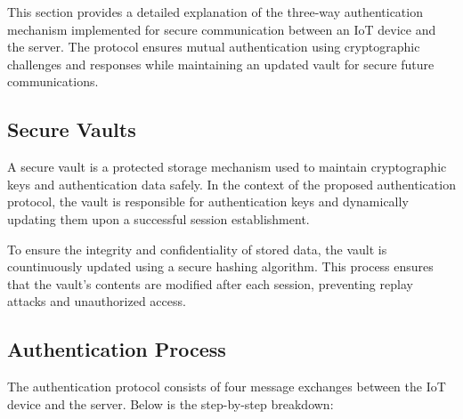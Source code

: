 \documentclass[10pt,twocolumn,letterpaper]{article}
\begin{document}
This section provides a detailed explanation of the three-way authentication mechanism implemented for secure communication between an IoT device and the server. The protocol ensures mutual authentication using cryptographic challenges and responses while maintaining an updated vault for secure future communications.

\subsection{Secure Vaults}

A secure vault is a protected storage mechanism used to maintain cryptographic keys and authentication data safely. In the context of the proposed authentication protocol, the vault is responsible for authentication keys and dynamically updating them upon a successful session establishment.

To ensure the integrity and confidentiality of stored data, the vault is countinuously updated using a secure hashing algorithm. This process
ensures that the vault's contents are modified after each session, preventing replay attacks and unauthorized access.


\subsection{Authentication Process}
The authentication protocol consists of four message exchanges between the IoT device and the server. Below is the step-by-step breakdown:
\end{document}
